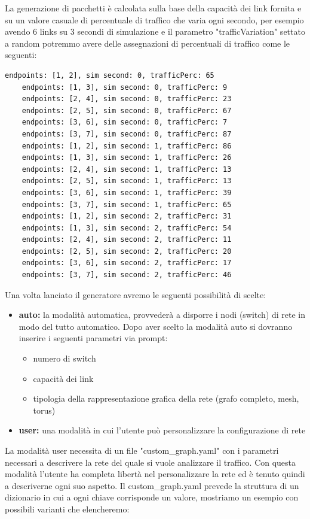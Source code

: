 \documentclass[binding=0.6cm]{sapthesis}
\begin{document}
La generazione di pacchetti è calcolata sulla base 
della capacità dei link fornita e su un valore casuale di percentuale di traffico 
che varia ogni secondo, per esempio avendo 6 links su 3 secondi di simulazione e il 
parametro "trafficVariation" settato a random potremmo avere delle assegnazioni di 
percentuali di traffico come le seguenti:
{\scriptsize %
\begin{lstlisting}[caption={esempio di variazione traffico casuale}]
    endpoints: [1, 2], sim second: 0, trafficPerc: 65
    endpoints: [1, 3], sim second: 0, trafficPerc: 9
    endpoints: [2, 4], sim second: 0, trafficPerc: 23
    endpoints: [2, 5], sim second: 0, trafficPerc: 67
    endpoints: [3, 6], sim second: 0, trafficPerc: 7
    endpoints: [3, 7], sim second: 0, trafficPerc: 87
    endpoints: [1, 2], sim second: 1, trafficPerc: 86
    endpoints: [1, 3], sim second: 1, trafficPerc: 26
    endpoints: [2, 4], sim second: 1, trafficPerc: 13
    endpoints: [2, 5], sim second: 1, trafficPerc: 13
    endpoints: [3, 6], sim second: 1, trafficPerc: 39
    endpoints: [3, 7], sim second: 1, trafficPerc: 65
    endpoints: [1, 2], sim second: 2, trafficPerc: 31
    endpoints: [1, 3], sim second: 2, trafficPerc: 54
    endpoints: [2, 4], sim second: 2, trafficPerc: 11
    endpoints: [2, 5], sim second: 2, trafficPerc: 20
    endpoints: [3, 6], sim second: 2, trafficPerc: 17
    endpoints: [3, 7], sim second: 2, trafficPerc: 46
\end{lstlisting}
}
Una volta lanciato il generatore avremo le seguenti possibilità di scelte:

\begin{itemize}
    \item \textbf{auto:} la modalità automatica, provvederà a disporre i nodi (switch) di rete in modo del
    tutto automatico. Dopo aver scelto la modalità auto si dovranno inserire i seguenti parametri via prompt:
    \begin{itemize}
        \item numero di switch
        \item capacità dei link
        \item tipologia della rappresentazione grafica della rete (grafo completo, mesh, torus)
    \end{itemize}
    \item \textbf{user:} una modalità in cui l'utente può personalizzare la configurazione di 
    rete
\end{itemize}
La modalità user necessita di un file "custom\_graph.yaml" con i parametri 
necessari a descrivere la rete del quale si vuole analizzare il traffico. 
Con questa modalità l'utente ha completa libertà nel personalizzare la rete ed 
è tenuto quindi a descriverne ogni suo aspetto. Il custom\_graph.yaml prevede la 
struttura di un dizionario in cui a ogni chiave corrisponde un valore, mostriamo un esempio con possibili varianti che elencheremo:
\end{document}
